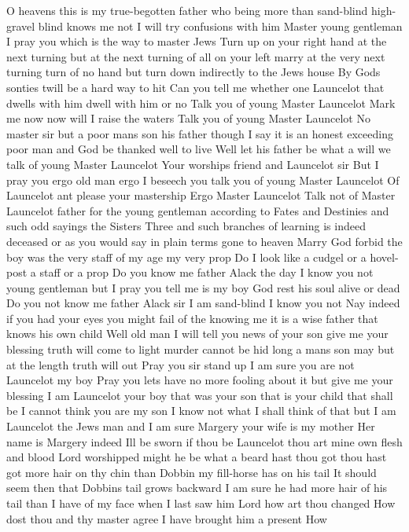 O heavens this is my true-begotten father
who being more than sand-blind high-gravel blind
knows me not I will try confusions with him
Master young gentleman I pray you which is the way
to master Jews
Turn up on your right hand at the next turning but
at the next turning of all on your left marry at
the very next turning turn of no hand but turn
down indirectly to the Jews house
By Gods sonties twill be a hard way to hit Can
you tell me whether one Launcelot
that dwells with him dwell with him or no
Talk you of young Master Launcelot
Mark me now now will I raise the waters Talk you
of young Master Launcelot
No master sir but a poor mans son his father
though I say it is an honest exceeding poor man
and God be thanked well to live
Well let his father be what a will we talk of
young Master Launcelot
Your worships friend and Launcelot sir
But I pray you ergo old man ergo I beseech you
talk you of young Master Launcelot
Of Launcelot ant please your mastership
Ergo Master Launcelot Talk not of Master
Launcelot father for the young gentleman
according to Fates and Destinies and such odd
sayings the Sisters Three and such branches of
learning is indeed deceased or as you would say
in plain terms gone to heaven
Marry God forbid the boy was the very staff of my
age my very prop
Do I look like a cudgel or a hovel-post a staff or
a prop Do you know me father
Alack the day I know you not young gentleman
but I pray you tell me is my boy God rest his
soul alive or dead
Do you not know me father
Alack sir I am sand-blind I know you not
Nay indeed if you had your eyes you might fail of
the knowing me it is a wise father that knows his
own child Well old man I will tell you news of
your son give me your blessing truth will come
to light murder cannot be hid long a mans son
may but at the length truth will out
Pray you sir stand up I am sure you are not
Launcelot my boy
Pray you lets have no more fooling about it but
give me your blessing I am Launcelot your boy
that was your son that is your child that shall
be
I cannot think you are my son
I know not what I shall think of that but I am
Launcelot the Jews man and I am sure Margery your
wife is my mother
Her name is Margery indeed Ill be sworn if thou
be Launcelot thou art mine own flesh and blood
Lord worshipped might he be what a beard hast thou
got thou hast got more hair on thy chin than
Dobbin my fill-horse has on his tail
It should seem then that Dobbins tail grows
backward I am sure he had more hair of his tail
than I have of my face when I last saw him
Lord how art thou changed How dost thou and thy
master agree I have brought him a present How
